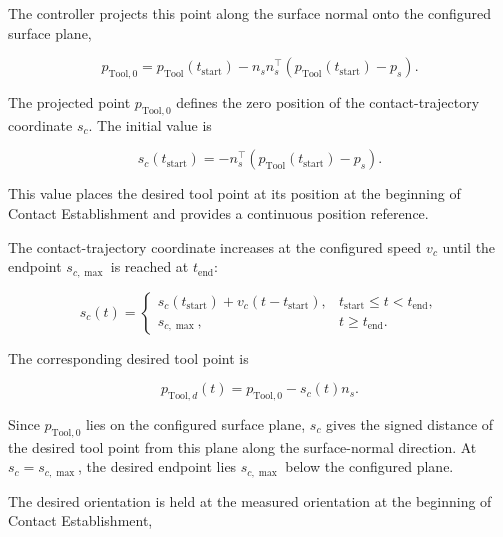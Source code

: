 The controller projects this point along the surface normal onto the
configured surface plane,

\begin{equation}
p_{\mathrm{Tool},0}
=
p_{\mathrm{Tool}}(t_{\mathrm{start}})
-n_sn_s^\top\left(p_{\mathrm{Tool}}(t_{\mathrm{start}})-p_s\right).
\label{eq:implementation_projected_tool_point}
\end{equation}

The projected point \mbox{\(p_{\mathrm{Tool},0}\)} defines the zero position of
the contact-trajectory coordinate \mbox{\(s_c\)}. The initial value is

\begin{equation}
s_c(t_{\mathrm{start}})
=
-n_s^\top\left(p_{\mathrm{Tool}}(t_{\mathrm{start}})-p_s\right).
\label{eq:implementation_setup_initial_coordinate}
\end{equation}

This value places the desired tool point at its position at the beginning of
Contact Establishment and provides a continuous position reference.

The contact-trajectory coordinate increases at the configured speed
\mbox{\(v_c\)} until the endpoint \mbox{\(s_{c,\max}\)} is reached at
\mbox{\(t_{\mathrm{end}}\)}:

\begin{equation}
s_c(t)
=
\begin{cases}
s_c(t_{\mathrm{start}})+v_c\left(t-t_{\mathrm{start}}\right),
& t_{\mathrm{start}}\leq t<t_{\mathrm{end}},\\[4pt]
s_{c,\max}, & t\geq t_{\mathrm{end}}.
\end{cases}
\label{eq:implementation_setup_press_coordinate}
\end{equation}

The corresponding desired tool point is

\begin{equation}
p_{\mathrm{Tool},d}(t)=p_{\mathrm{Tool},0}-s_c(t)n_s.
\label{eq:implementation_setup_face_point_reference}
\end{equation}

Since \mbox{\(p_{\mathrm{Tool},0}\)} lies on the configured surface plane,
\mbox{\(s_c\)} gives the signed distance of the desired tool point from this
plane along the surface-normal direction. At \mbox{\(s_c=s_{c,\max}\)}, the
desired endpoint lies \mbox{\(s_{c,\max}\)} below the configured plane.

The desired orientation is held at the measured orientation at the beginning of
Contact Establishment,

